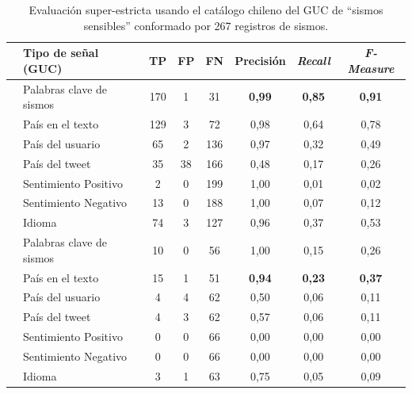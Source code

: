 \begin{table}[!ht]
\centering
  \begin{tabular}{c|lcccccc}
    \toprule
    & \multicolumn{1}{l}{{Tipo de señal (GUC)}}&\multicolumn{1}{c}{{TP}}&\multicolumn{1}{c}{{FP}}&\multicolumn{1}{c}{{FN}}&\multicolumn{1}{c}{{Precisión}}&\multicolumn{1}{c}{{\em Recall}}&\multicolumn{1}{c}{{\em F-Measure}}\\
    \midrule
    \parbox[t]{1.5mm}{\vspace{-0.3cm}}
    & {Palabras clave de sismos} & 170 & 1 & 31 & {{\bf 0,99}} &  {{\bf 0,85}} & {{\bf 0,91}} \\
	& {País en el texto } & 129 & 3 & 72 & {0,98} & {0,64} & {0,78} \\    
    & {País del usuario} & 65 & 2 & 136  & {0,97} & {0,32} & {0,49} \\
    & {País del tweet} & 35 & 38 & 166 & {0,48} & {0,17} & {0,26} \\  
    & {Sentimiento Positivo} & 2 & 0 & 199 & {1,00} & {0,01} & {0,02} \\
    & {Sentimiento Negativo} & 13 & 0 & 188 & {1,00} &	{0,07} & {0,12} \\
    & {Idioma} & 74 & 3 & 127 & {0,96} & {0,37} & {0,53} \\
    \midrule
    \parbox[t]{1.5mm}{\vspace{-0.3cm}}
	& {Palabras clave de sismos} & 10 & 0 & 56 & {1,00} & {0,15} & {0,26} \\
	& {País en el texto} & 15 & 1 & 51 & {\bf 0,94} & {\bf 0,23} & {\bf 0,37} \\
	& {País del usuario} & 4 & 4 & 62 & {0,50} & {0,06} & {0,11} \\
	& {País del tweet} & 4 & 3 & 62 & {0,57} & {0,06} & {0,11} \\ 
	& {Sentimiento Positivo} & 0 & 0 & 66  & {0,00} & {0,00} & {0,00}  \\
	& {Sentimiento Negativo} & 0 & 0 & 66  & {0,00} & {0,00} & {0,00}  \\
	& {Idioma} & 3 & 1 & 63 & {0,75} & {0,05} & {0,09} \\
    \bottomrule
  \end{tabular}
  \caption{{Evaluación super-estricta usando el catálogo chileno del GUC de ``sismos sensibles'' conformado por 267 registros de sismos.}}
  \label{table:super-strict}
\end{table}


